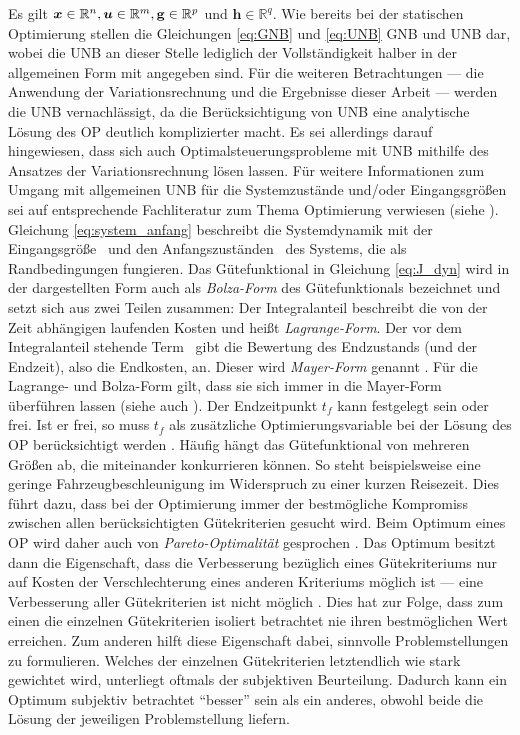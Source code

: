 Es gilt $\boldsymbol{x}\in\mathbb{R}^n, \boldsymbol{u}\in\mathbb{R}^m, \mathbf{g}\in\mathbb{R}^p$ und $\mathbf{h}\in\mathbb{R}^q$. Wie bereits bei der statischen Optimierung stellen die Gleichungen \eqref{eq:GNB} und \eqref{eq:UNB} \gls{GNB} und \gls{UNB} dar, wobei die \gls{UNB} an dieser Stelle lediglich der Vollständigkeit halber in der allgemeinen Form mit angegeben sind. Für die weiteren Betrachtungen --- die Anwendung der Variationsrechnung und die Ergebnisse dieser Arbeit --- werden die \gls{UNB} vernachlässigt, da die Berücksichtigung von \gls{UNB} eine analytische Lösung des \gls{OP} deutlich komplizierter macht. Es sei allerdings darauf hingewiesen, dass sich auch Optimalsteuerungsprobleme mit \gls{UNB} mithilfe des Ansatzes der Variationsrechnung lösen lassen. Für weitere Informationen zum Umgang mit allgemeinen \gls{UNB} für die Systemzustände und/oder Eingangsgrößen sei auf entsprechende Fachliteratur zum Thema Optimierung verwiesen (siehe \cite{Papageorgiou.2012, Gerdts.2010}). Gleichung \eqref{eq:system_anfang} beschreibt die Systemdynamik mit der Eingangsgröße \uoft~und den Anfangszuständen \xzero~des Systems, die als Randbedingungen fungieren. Das Gütefunktional in Gleichung \eqref{eq:J_dyn} wird in der dargestellten Form auch als \textit{Bolza-Form} des Gütefunktionals bezeichnet und setzt sich aus zwei Teilen zusammen: Der Integralanteil beschreibt die von der Zeit abhängigen laufenden Kosten und heißt \textit{Lagrange-Form}. Der vor dem Integralanteil stehende Term \Vofxoftf~gibt die Bewertung des Endzustands (und der Endzeit), also die Endkosten, an. Dieser wird \textit{Mayer-Form} genannt \cite{KnutGraichen.2012}. Für die Lagrange- und Bolza-Form gilt, dass sie sich immer in die Mayer-Form überführen lassen \cite{KnutGraichen.2012} (siehe auch \cite{Gerdts.2010}). Der Endzeitpunkt $t_f$ kann festgelegt sein oder frei. Ist er frei, so muss $t_f$ als zusätzliche Optimierungsvariable bei der Lösung des \gls{OP} berücksichtigt werden \cite{KnutGraichen.2012}. Häufig hängt das Gütefunktional von mehreren Größen ab, die miteinander konkurrieren können. So steht beispielsweise eine geringe Fahrzeugbeschleunigung im Widerspruch zu einer kurzen Reisezeit. Dies führt dazu, dass bei der Optimierung immer der bestmögliche Kompromiss zwischen allen berücksichtigten Gütekriterien gesucht wird. Beim Optimum eines \gls{OP} wird daher auch von \textit{Pareto-Optimalität} gesprochen \cite{Papageorgiou.2012}. Das Optimum besitzt dann die Eigenschaft, dass die Verbesserung bezüglich eines Gütekriteriums nur auf Kosten der Verschlechterung eines anderen Kriteriums möglich ist --- eine Verbesserung aller Gütekriterien ist nicht möglich \cite{Papageorgiou.2012}. Dies hat zur Folge, dass zum einen die einzelnen Gütekriterien isoliert betrachtet nie ihren bestmöglichen Wert erreichen. Zum anderen hilft diese Eigenschaft dabei, sinnvolle Problemstellungen zu formulieren. Welches der einzelnen Gütekriterien letztendlich wie stark gewichtet wird, unterliegt oftmals der subjektiven Beurteilung. Dadurch kann ein Optimum subjektiv betrachtet ``besser'' sein als ein anderes, obwohl beide die Lösung der jeweiligen Problemstellung liefern.

